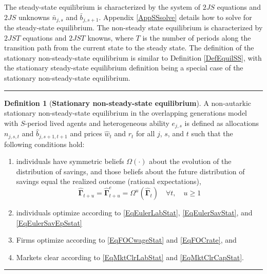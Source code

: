 \documentclass[letterpaper,12pt]{article}
\theoremstyle{definition}
\newtheorem{definition}{Definition} %
\begin{document}
    \begin{spacing}{1.5}
    \vspace{10mm}

    The steady-state equilibrium is characterized by the system of $2JS$ equations and $2JS$ unknowns $\bar{n}_{j,s}$ and $\bar{b}_{j,s+1}$. Appendix \ref{AppSSsolve} details how to solve for the steady-state equilibrium. 
    The non-steady state equilibrium is characterized by $2JST$ equations and $2JST$ knowns, where $T$ is the number of periods along the transition path from the current state to the steady state.  The definition of the stationary non-steady-state equilibrium is similar to Definition \ref{DefEquilSS}, with the stationary steady-state equilibrium definition being a special case of the stationary non-steady-state equilibrium.

  \vspace{7mm}

  \hrule
  \begin{definition}[\textbf{Stationary non-steady-state equilibrium}]\label{DefEquilNonSS}
    A non-autarkic stationary non-steady-state equilibrium in the overlapping generations model with $S$-period lived agents and heterogeneous ability $e_{j,s}$ is defined as allocations $n_{j,s,t}$ and $\hat{b}_{j,s+1,t+1}$ and prices $\hat{w}_t$ and $r_t$ for all $j$, $s$, and $t$ such that the following conditions hold:
     \begin{enumerate}
        \item individuals have symmetric beliefs $\Omega(\cdot)$ about the evolution of the distribution of savings, and those beliefs about the future distribution of savings equal the realized outcome (rational expectations),
          \begin{equation*}
            \bm{\hat{\Gamma}}_{t+u} = \bm{\hat{\Gamma}}^e_{t+u} = \Omega^u\left( \bm{\hat{\Gamma}}_t\right) \quad\forall t, \quad u\geq 1
          \end{equation*}
        \item individuals optimize according to \eqref{EqEulerLabStat}, \eqref{EqEulerSavStat}, and \eqref{EqEulerSavEpSstat}
        \item Firms optimize according to \eqref{EqFOCwageStat} and \eqref{EqFOCrate}, and
        \item Markets clear according to \eqref{EqMktClrLabStat} and \eqref{EqMktClrCapStat}.
     \end{enumerate}
  \end{definition}
  \hrule


\end{spacing}
\end{document}
